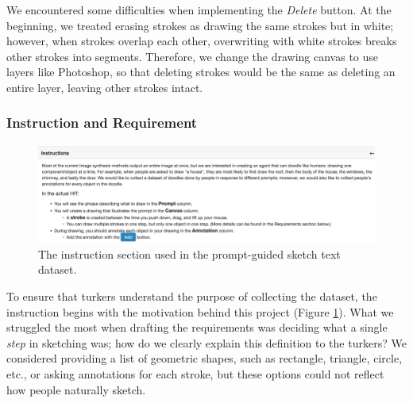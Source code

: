 We encountered some difficulties when implementing the \textit{Delete} button. At the beginning, we treated erasing strokes as drawing the same strokes but in white; however, when strokes overlap each other, overwriting with white strokes breaks other strokes into segments. Therefore, we change the drawing canvas to use layers like Photoshop, so that deleting strokes would be the same as deleting an entire layer, leaving other strokes intact.   

\subsubsection{Instruction and Requirement}

\begin{figure}[!htb]    
\includegraphics[width=\linewidth]{data_collection/v1_instruction.png} 
\caption{The instruction section used in the prompt-guided sketch text dataset.}
\label{v1.instruction}
\end{figure}

To ensure that turkers understand the purpose of collecting the dataset, the instruction begins with the motivation behind this project (Figure \ref{v1.instruction}). 
What we struggled the most when drafting the requirements was deciding what a single \textit{step} in sketching was; how do we clearly explain this definition to the turkers? 
We considered providing a list of geometric shapes, such as rectangle, triangle, circle, etc., or asking annotations for each stroke, but these options could not reflect how people naturally sketch.


